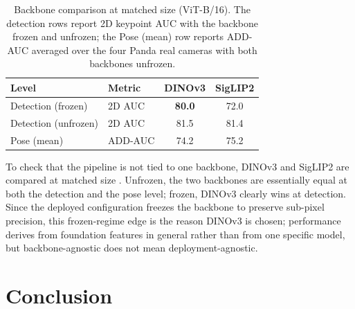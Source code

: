 \begin{table}[t!]
\centering
\renewcommand{\arraystretch}{1.1}
\begin{tabular}{@{} l l cc @{}}
\toprule
\textbf{Level} & \textbf{Metric} & \textbf{DINOv3} & \textbf{SigLIP2} \\
\midrule
Detection (frozen) & 2D AUC & \textbf{80.0} & 72.0 \\
Detection (unfrozen) & 2D AUC & 81.5 & 81.4 \\
Pose (mean) & ADD-AUC & 74.2 & 75.2 \\
\bottomrule
\end{tabular}
\caption{Backbone comparison at matched size (ViT-B/16). The detection rows report 2D keypoint AUC with the backbone frozen and unfrozen; the Pose (mean) row reports ADD-AUC averaged over the four Panda real cameras with both backbones unfrozen.}
\label{tab:backbone}
\end{table}

To check that the pipeline is not tied to one backbone, DINOv3 and SigLIP2 are compared at matched size \cite{simeoni2025dinov3,tschannen2025siglip}. Unfrozen, the two backbones are essentially equal at both the detection and the pose level; frozen, DINOv3 clearly wins at detection. Since the deployed configuration freezes the backbone to preserve sub-pixel precision, this frozen-regime edge is the reason DINOv3 is chosen; performance derives from foundation features in general rather than from one specific model, but backbone-agnostic does not mean deployment-agnostic.






\section{Conclusion}
\label{sec:conclusion}

